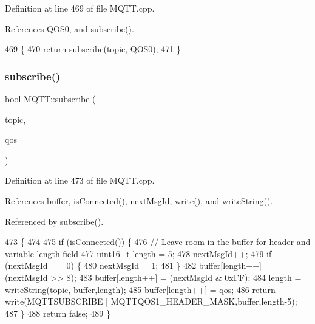 Definition at line 469 of file M\+Q\+T\+T.\+cpp.



References Q\+O\+S0, and subscribe().


\begin{DoxyCode}
469                                       \{
470     \textcolor{keywordflow}{return} subscribe(topic, QOS0);
471 \}
\end{DoxyCode}
\mbox{\label{class_m_q_t_t_ac619e73524dcc0aa2c70ae160d7b6689}} 
\subsubsection{subscribe()\hspace{0.1cm}{\footnotesize\ttfamily [2/2]}}
{\footnotesize\ttfamily bool M\+Q\+T\+T\+::subscribe (\begin{DoxyParamCaption}\item[{const char $\ast$}]{topic,  }\item[{\textbf{ E\+M\+Q\+T\+T\+\_\+\+Q\+OS}}]{qos }\end{DoxyParamCaption})}



Definition at line 473 of file M\+Q\+T\+T.\+cpp.



References buffer, is\+Connected(), next\+Msg\+Id, write(), and write\+String().



Referenced by subscribe().


\begin{DoxyCode}
473                                                      \{
474 
475     \textcolor{keywordflow}{if} (isConnected()) \{
476         \textcolor{comment}{// Leave room in the buffer for header and variable length field}
477         uint16\_t length = 5;
478         nextMsgId++;
479         \textcolor{keywordflow}{if} (nextMsgId == 0) \{
480             nextMsgId = 1;
481         \}
482         buffer[length++] = (nextMsgId >> 8);
483         buffer[length++] = (nextMsgId & 0xFF);
484         length = writeString(topic, buffer,length);
485         buffer[length++] = qos;
486         \textcolor{keywordflow}{return} write(MQTTSUBSCRIBE | MQTTQOS1_HEADER_MASK,buffer,length-5);
487     \}
488     \textcolor{keywordflow}{return} \textcolor{keyword}{false};
489 \}
\end{DoxyCode}
\mbox{\label{class_m_q_t_t_a70bfce6554c3d08f7a0e174d23a8b642}} 
